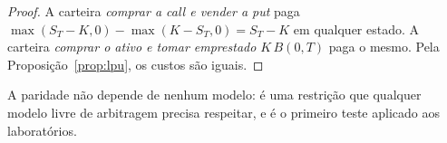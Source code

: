 \begin{proof}
A carteira \emph{comprar a call e vender a put} paga $\max(S_T-K,0)-\max(K-S_T,0)=S_T-K$ em qualquer estado. A carteira \emph{comprar o ativo e tomar emprestado $K\,B(0,T)$} paga o mesmo. Pela Proposição~\ref{prop:lpu}, os custos são iguais.
\end{proof}

A paridade não depende de nenhum modelo: é uma restrição que qualquer modelo livre de arbitragem precisa respeitar, e é o primeiro teste aplicado aos laboratórios.
